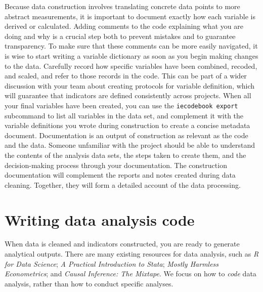 Because data construction involves translating concrete data points to more abstract measurements,
it is important to document exactly how each variable is derived or calculated.
Adding comments to the code explaining what you are doing and why is a crucial step both to prevent mistakes and to guarantee transparency.
To make sure that these comments can be more easily navigated,
it is wise to start writing a variable dictionary as soon as you begin making changes to the data.
Carefully record how specific variables have been combined, recoded, and scaled,
and refer to those records in the code.
This can be part of a wider discussion with your team about creating protocols for variable definition,
which will guarantee that indicators are defined consistently across projects.
When all your final variables have been created,
you can use the \texttt{iecodebook export} subcommand to list all variables in the data set,
and complement it with the variable definitions you wrote during construction to create a concise metadata document.
Documentation is an output of construction as relevant as the code and the data.
Someone unfamiliar with the project should be able to understand the contents of the analysis data sets,
the steps taken to create them,
and the decision-making process through your documentation.
The construction documentation will complement the reports and notes created during data cleaning.
Together, they will form a detailed account of the data processing.


\section{Writing data analysis code}

When data is cleaned and indicators constructed, you are ready to generate analytical outputs.
There are many existing resources for data analysis, such as
\textit{R for Data Science};
\textit{A Practical Introduction to Stata};
\textit{Mostly Harmless Econometrics};
and \textit{Causal Inference: The Mixtape}.
We focus on how to \textit{code} data analysis, rather than how to conduct specific analyses. 

